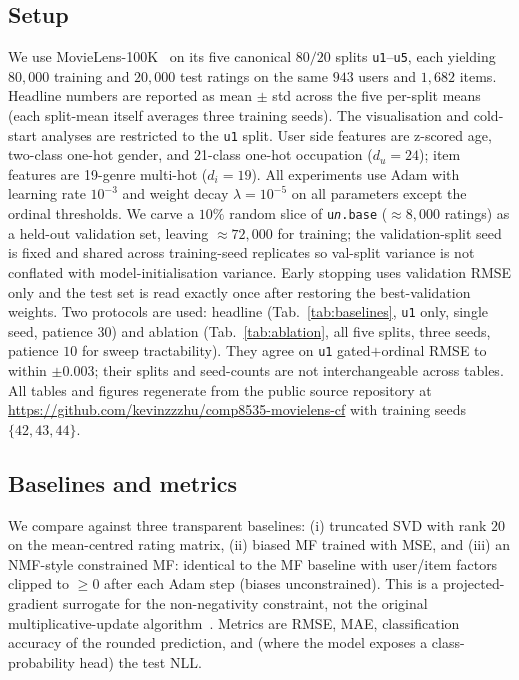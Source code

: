 \documentclass[a4paper]{article} %
\begin{document}
\subsection{Setup}
We use MovieLens-100K~\cite{harper2015movielens} on its five canonical
$80/20$ splits \texttt{u1}--\texttt{u5}, each yielding $80{,}000$ training and
$20{,}000$ test ratings on the same $943$ users and $1{,}682$ items.
Headline numbers are reported as mean $\pm$ std across the five per-split means
(each split-mean itself averages three training seeds). The visualisation and
cold-start analyses are restricted to the \texttt{u1} split. User side features are z-scored age,
two-class one-hot gender, and 21-class one-hot occupation ($d_u=24$); item
features are 19-genre multi-hot ($d_i=19$). All experiments use Adam with learning rate $10^{-3}$ and weight decay
$\lambda=10^{-5}$ on all parameters except the ordinal thresholds. We carve a
$10\%$ random slice of \texttt{u\textit{n}.base} ($\approx\!8{,}000$ ratings)
as a held-out validation set, leaving $\approx\!72{,}000$ for training; the
validation-split seed is fixed and shared across training-seed replicates so
val-split variance is not conflated with model-initialisation variance.
Early stopping uses validation RMSE only and the test set is read exactly
once after restoring the best-validation weights. Two protocols are used: headline (Tab.~\ref{tab:baselines}, \texttt{u1}
only, single seed, patience $30$) and ablation (Tab.~\ref{tab:ablation},
all five splits, three seeds, patience $10$ for sweep tractability). They
agree on \texttt{u1} gated$+$ordinal RMSE to within $\pm0.003$; their splits
and seed-counts are not interchangeable across tables. All
tables and figures regenerate from the public source repository at
\url{https://github.com/kevinzzzhu/comp8535-movielens-cf} with training seeds
$\{42,43,44\}$.

\subsection{Baselines and metrics}
We compare against three transparent baselines: (i) truncated SVD with rank
$20$ on the mean-centred rating matrix, (ii) biased MF trained with MSE, and
(iii) an NMF-style constrained MF: identical to the MF baseline with user/item
factors clipped to $\ge0$ after each Adam step (biases unconstrained). This is
a projected-gradient surrogate for the non-negativity constraint, not the
original multiplicative-update algorithm~\cite{lee2000nmf}. Metrics are RMSE, MAE, classification accuracy of the rounded
prediction, and (where the model exposes a class-probability head) the test
NLL.
\end{document}
